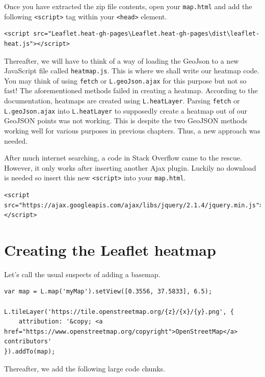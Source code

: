 \documentclass[
]{book}
\begin{document}
Once you have extracted the zip file contents, open your \texttt{map.html} and add the following \texttt{\textless{}script\textgreater{}} tag within your \texttt{\textless{}head\textgreater{}} element.

\begin{verbatim}
<script src="Leaflet.heat-gh-pages\Leaflet.heat-gh-pages\dist\leaflet-heat.js"></script>
\end{verbatim}

Thereafter, we will have to think of a way of loading the GeoJson to a new JavaScript file called \texttt{heatmap.js}. This is where we shall write our heatmap code. You may think of using \texttt{fetch} or \texttt{L.geoJson.ajax} for this purpose but not so fast! The aforementioned methods failed in creating a heatmap. According to the documentation, heatmaps are created using \texttt{L.heatLayer}. Parsing \texttt{fetch} or \texttt{L.geoJson.ajax} into \texttt{L.heatLayer} to supposedly create a heatmap out of our GeoJSON points was not working. This is despite the two GeoJSON methods working well for various purposes in previous chapters. Thus, a new approach was needed.

After much internet searching, a code in Stack Overflow came to the rescue. However, it only works after inserting another Ajax plugin. Luckily no download is needed so insert this new \texttt{\textless{}script\textgreater{}} into your \texttt{map.html}.

\begin{verbatim}
<script src="https://ajax.googleapis.com/ajax/libs/jquery/2.1.4/jquery.min.js"></script>
\end{verbatim}

\hypertarget{creating-the-leaflet-heatmap}{%
\section{Creating the Leaflet heatmap}\label{creating-the-leaflet-heatmap}}

Let's call the usual suspects of adding a basemap.

\begin{verbatim}
var map = L.map('myMap').setView([0.3556, 37.5833], 6.5);

L.tileLayer('https://tile.openstreetmap.org/{z}/{x}/{y}.png', {
    attribution: '&copy; <a href="https://www.openstreetmap.org/copyright">OpenStreetMap</a> contributors'
}).addTo(map);
\end{verbatim}

Thereafter, we add the following large code chunks.
\end{document}
